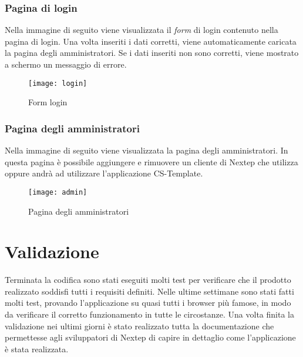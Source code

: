 \subsubsection{Pagina di login}
Nella immagine di seguito viene visualizzata il \emph{form} di login contenuto nella pagina di login. Una volta inseriti i dati corretti, viene automaticamente caricata la pagina degli amministratori. Se i dati inseriti non sono corretti, viene mostrato a schermo un messaggio di errore.
\begin{figure}[!h] 
	\centering 
	\texttt{[image: login]} 
	\caption{Form login }
\end{figure}
\subsubsection{Pagina degli amministratori}
Nella immagine di seguito viene visualizzata la pagina degli amministratori. In questa pagina è possibile aggiungere e rimuovere un cliente di Nextep che utilizza oppure andrà ad utilizzare l'applicazione CS-Template.
\begin{figure}[!h] 
	\centering 
	\texttt{[image: admin]} 
	\caption{Pagina degli amministratori }
\end{figure}

\section{Validazione} 
Terminata la codifica sono stati eseguiti molti test per verificare che il prodotto realizzato soddisfi tutti i requisiti definiti. Nelle ultime settimane sono stati fatti molti test, provando l'applicazione su quasi tutti i browser più famose, in modo da verificare il corretto funzionamento in tutte le circostanze. Una volta finita la validazione nei ultimi giorni è stato realizzato tutta la documentazione che permettesse agli sviluppatori di Nextep di capire in dettaglio come l'applicazione è stata realizzata.  